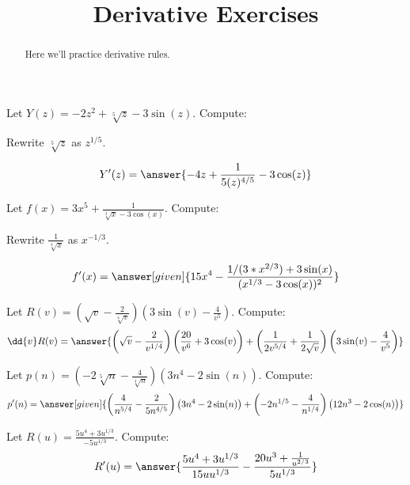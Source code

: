 \documentclass[handout]{ximera}
\title{Derivative Exercises}
\begin{document}
\begin{abstract}
  Here we'll practice derivative rules.
\end{abstract}
\maketitle

\begin{exercise}
Let $Y(z) = -2 z^2 + \sqrt[5]{z} -3 \sin (z)$. Compute:

\begin{hint}
Rewrite $\sqrt[5]{z}$ as $z^{1/5}$.
\end{hint}

\[
Y'(z)
=\answer{-4z+\frac{1}{5 (z)^{4/5}}-3 \cos(z)}
\]
\end{exercise}


\begin{exercise}
Let $f(x) = 3x^5+\frac{1}{\sqrt[3]{x}-3 \cos (x)}$. Compute:

\begin{hint}
Rewrite $\frac{1}{\sqrt[3]{x}}$ as $x^{-1/3}$.
\end{hint}
\[
f'(x)
=\answer[given]{15x^4-\frac{1/(3*x^{2/3}) + 3\sin(x)}{(x^{1/3} - 3\cos(x))^2}}
\]
\end{exercise}

\begin{exercise}
Let $R(v) = \left(\sqrt{v}-\frac{2}{\sqrt[4]{v}}\right) \left(3 \sin (v)-\frac{4}{v^5}\right)$. Compute:
\[
\dd{v}R(v)
=\answer{\left(\sqrt{v}-\frac{2}{{v}^{1/4}}\right) \left(\frac{20}{v^6}+3 \cos (v)\right) + \left(\frac{1}{2 {v}^{5/4}}+\frac{1}{2 \sqrt{v}}\right) \left(3 \sin (v)-\frac{4}{v^5}\right)}
\]
\end{exercise}

\begin{exercise}
Let $p(n) = \left(-2 \sqrt[5]{n}-\frac{4}{\sqrt[4]{n}}\right) \left(3 n^4-2 \sin (n)\right)$. Compute:
\[
p'(n)
=\answer[given]{\left(\frac{4}{{n}^{5/4}}-\frac{2}{5 {n}^{4/5}}\right) \left(3 n^4 - 2 \sin (n)\right)+\left(-2 {n}^{1/5}-\frac{4}{{n}^{1/4}}\right) \left(12 n^3 - 2 \cos (n)\right)}
\]
\end{exercise}

\begin{exercise}
Let $R(u) = \frac{5 u^4+3 {u}^{1/3}}{-5 {u}^{1/3}}$. Compute:
\[
R'(u)
=\answer{\frac{5 u^4 + 3 {u}^{1/3}}{15 u {u}^{1/3}}-\frac{20 u^3+\frac{1}{{u}^{2/3}}}{5 {u}^{1/3}}}
\]
\end{exercise}
\end{document}
